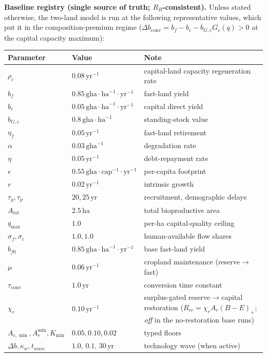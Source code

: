 \documentclass[11pt]{article}
\begin{document}
\noindent\textbf{Baseline registry (single source of truth; $R_B$-consistent).} Unless stated otherwise, the
two-land model is run at the following representative values, which put it in the composition-premium regime
($\Delta b_{\mathrm{conv}}=b_f-b_c-b_{G,c}G_c(q)>0$ at the capital capacity maximum):

\begin{table}[htbp]
\centering
\small
\begin{tabularx}{\textwidth}{l>{\raggedright\arraybackslash}X>{\raggedright\arraybackslash}X}
\toprule
Parameter & Value & Note \\
\midrule
$\rho_c$ & $0.08\,\text{yr}^{-1}$ & capital-land capacity regeneration rate \\
$b_f$ & $0.85\,\text{gha}\cdot\text{ha}^{-1}\cdot\text{yr}^{-1}$ & fast-land yield \\
$b_c$ & $0.05\,\text{gha}\cdot\text{ha}^{-1}\cdot\text{yr}^{-1}$ & capital direct yield \\
$b_{G,c}$ & $0.8\,\text{gha}\cdot\text{ha}^{-1}$ & standing-stock value \\
$\eta_f$ & $0.05\,\text{yr}^{-1}$ & fast-land retirement \\
$\alpha$ & $0.03\,\text{gha}^{-1}$ & degradation rate \\
$\eta$ & $0.05\,\text{yr}^{-1}$ & debt-repayment rate \\
$e$ & $0.55\,\text{gha}\cdot\text{cap}^{-1}\cdot\text{yr}^{-1}$ & per-capita footprint \\
$r$ & $0.02\,\text{yr}^{-1}$ & intrinsic growth \\
$\tau_g,\tau_p$ & $20,25$\,yr & recruitment, demographic delays \\
$A_{tot}$ & $2.5$\,ha & total bioproductive area \\
$q_{\max}$ & $1.0$ & per-ha capital-quality ceiling \\
$\sigma_f,\sigma_c$ & $1.0,1.0$ & human-available flow shares \\
$b_{f0}$ & $0.85\,\text{gha}\cdot\text{ha}^{-1}\cdot\text{yr}^{-1}$ & base fast-land yield \\
$\mu$ & $0.06\,\text{yr}^{-1}$ & cropland maintenance (reserve$\to$fast) \\
$\tau_{\mathrm{conv}}$ & $1.0$\,yr & conversion time constant \\
$\chi_r$ & $0.10\,\text{yr}^{-1}$ & surplus-gated reserve$\to$capital restoration ($R_{rc}=\chi_r A_r(B-E)_+$; \emph{off} in the no-restoration base runs) \\
$A_{c,\min},A_r^{\min},K_{\min}$ & $0.05,0.10,0.02$ & typed floors \\
$\Delta b,\kappa_w,t_{wave}$ & $1.0,\,0.1,\,30$\,yr & technology wave (when active) \\
\bottomrule
\end{tabularx}
\end{table}
\end{document}
